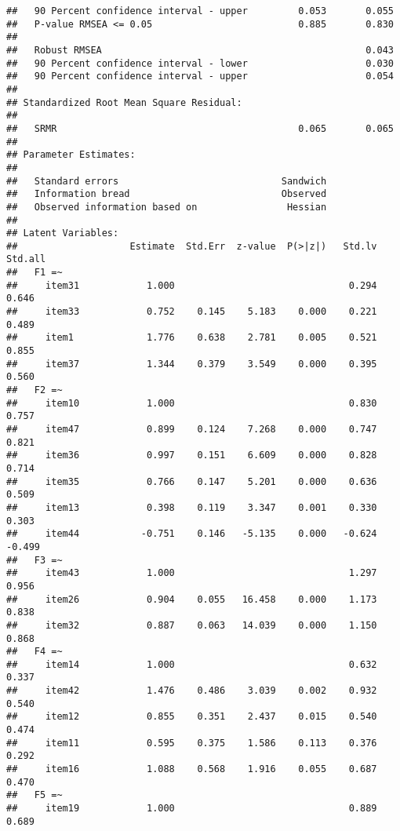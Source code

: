 \documentclass[
  english,
  man]{apa6}
\begin{document}
\begin{verbatim}
##   90 Percent confidence interval - upper         0.053       0.055
##   P-value RMSEA <= 0.05                          0.885       0.830
##                                                                   
##   Robust RMSEA                                               0.043
##   90 Percent confidence interval - lower                     0.030
##   90 Percent confidence interval - upper                     0.054
## 
## Standardized Root Mean Square Residual:
## 
##   SRMR                                           0.065       0.065
## 
## Parameter Estimates:
## 
##   Standard errors                             Sandwich
##   Information bread                           Observed
##   Observed information based on                Hessian
## 
## Latent Variables:
##                    Estimate  Std.Err  z-value  P(>|z|)   Std.lv  Std.all
##   F1 =~                                                                 
##     item31            1.000                               0.294    0.646
##     item33            0.752    0.145    5.183    0.000    0.221    0.489
##     item1             1.776    0.638    2.781    0.005    0.521    0.855
##     item37            1.344    0.379    3.549    0.000    0.395    0.560
##   F2 =~                                                                 
##     item10            1.000                               0.830    0.757
##     item47            0.899    0.124    7.268    0.000    0.747    0.821
##     item36            0.997    0.151    6.609    0.000    0.828    0.714
##     item35            0.766    0.147    5.201    0.000    0.636    0.509
##     item13            0.398    0.119    3.347    0.001    0.330    0.303
##     item44           -0.751    0.146   -5.135    0.000   -0.624   -0.499
##   F3 =~                                                                 
##     item43            1.000                               1.297    0.956
##     item26            0.904    0.055   16.458    0.000    1.173    0.838
##     item32            0.887    0.063   14.039    0.000    1.150    0.868
##   F4 =~                                                                 
##     item14            1.000                               0.632    0.337
##     item42            1.476    0.486    3.039    0.002    0.932    0.540
##     item12            0.855    0.351    2.437    0.015    0.540    0.474
##     item11            0.595    0.375    1.586    0.113    0.376    0.292
##     item16            1.088    0.568    1.916    0.055    0.687    0.470
##   F5 =~                                                                 
##     item19            1.000                               0.889    0.689

\end{verbatim}
\end{document}
